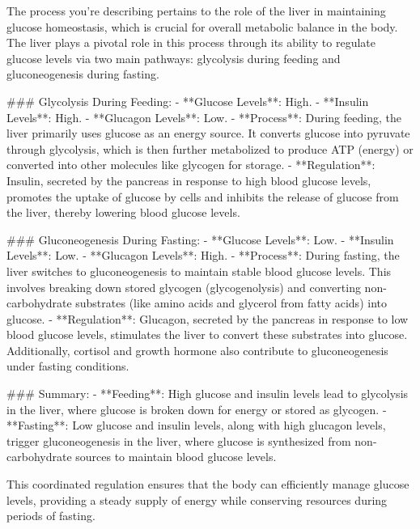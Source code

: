 The process you're describing pertains to the role of the liver in maintaining glucose homeostasis, which is crucial for overall metabolic balance in the body. The liver plays a pivotal role in this process through its ability to regulate glucose levels via two main pathways: glycolysis during feeding and gluconeogenesis during fasting.

### Glycolysis During Feeding:
- **Glucose Levels**: High.
- **Insulin Levels**: High.
- **Glucagon Levels**: Low.
- **Process**: During feeding, the liver primarily uses glucose as an energy source. It converts glucose into pyruvate through glycolysis, which is then further metabolized to produce ATP (energy) or converted into other molecules like glycogen for storage.
- **Regulation**: Insulin, secreted by the pancreas in response to high blood glucose levels, promotes the uptake of glucose by cells and inhibits the release of glucose from the liver, thereby lowering blood glucose levels.

### Gluconeogenesis During Fasting:
- **Glucose Levels**: Low.
- **Insulin Levels**: Low.
- **Glucagon Levels**: High.
- **Process**: During fasting, the liver switches to gluconeogenesis to maintain stable blood glucose levels. This involves breaking down stored glycogen (glycogenolysis) and converting non-carbohydrate substrates (like amino acids and glycerol from fatty acids) into glucose.
- **Regulation**: Glucagon, secreted by the pancreas in response to low blood glucose levels, stimulates the liver to convert these substrates into glucose. Additionally, cortisol and growth hormone also contribute to gluconeogenesis under fasting conditions.

### Summary:
- **Feeding**: High glucose and insulin levels lead to glycolysis in the liver, where glucose is broken down for energy or stored as glycogen.
- **Fasting**: Low glucose and insulin levels, along with high glucagon levels, trigger gluconeogenesis in the liver, where glucose is synthesized from non-carbohydrate sources to maintain blood glucose levels.

This coordinated regulation ensures that the body can efficiently manage glucose levels, providing a steady supply of energy while conserving resources during periods of fasting.